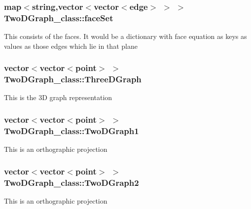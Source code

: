 \subsubsection[{\texorpdfstring{face\+Set}{faceSet}}]{\setlength{\rightskip}{0pt plus 5cm}map$<$string,vector$<$vector$<${\bf edge}$>$ $>$ $>$ Two\+D\+Graph\+\_\+class\+::face\+Set\hspace{0.3cm}{\ttfamily [static]}}\hypertarget{classTwoDGraph__class_a80d22cc10e3cfa2d3f090bc0b506e2ea}{}\label{classTwoDGraph__class_a80d22cc10e3cfa2d3f090bc0b506e2ea}
This consists of the faces. It would be a dictionary with face equation as keys as values as those edges which lie in that plane 
\subsubsection[{\texorpdfstring{Three\+D\+Graph}{ThreeDGraph}}]{\setlength{\rightskip}{0pt plus 5cm}vector$<$vector$<${\bf point}$>$ $>$ Two\+D\+Graph\+\_\+class\+::\+Three\+D\+Graph\hspace{0.3cm}{\ttfamily [static]}}\hypertarget{classTwoDGraph__class_a45b2a73d8f2a9ce4b72a2a6aaa8e2c4f}{}\label{classTwoDGraph__class_a45b2a73d8f2a9ce4b72a2a6aaa8e2c4f}
This is the 3D graph representation 
\subsubsection[{\texorpdfstring{Two\+D\+Graph1}{TwoDGraph1}}]{\setlength{\rightskip}{0pt plus 5cm}vector$<$vector$<${\bf point}$>$ $>$ Two\+D\+Graph\+\_\+class\+::\+Two\+D\+Graph1\hspace{0.3cm}{\ttfamily [static]}}\hypertarget{classTwoDGraph__class_a238b6e7f880ff95f27e21c951b54440b}{}\label{classTwoDGraph__class_a238b6e7f880ff95f27e21c951b54440b}
This is an orthographic projection 
\subsubsection[{\texorpdfstring{Two\+D\+Graph2}{TwoDGraph2}}]{\setlength{\rightskip}{0pt plus 5cm}vector$<$vector$<${\bf point}$>$ $>$ Two\+D\+Graph\+\_\+class\+::\+Two\+D\+Graph2\hspace{0.3cm}{\ttfamily [static]}}\hypertarget{classTwoDGraph__class_aaedb57508908d5d956caa874e6a88505}{}\label{classTwoDGraph__class_aaedb57508908d5d956caa874e6a88505}
This is an orthographic projection 
